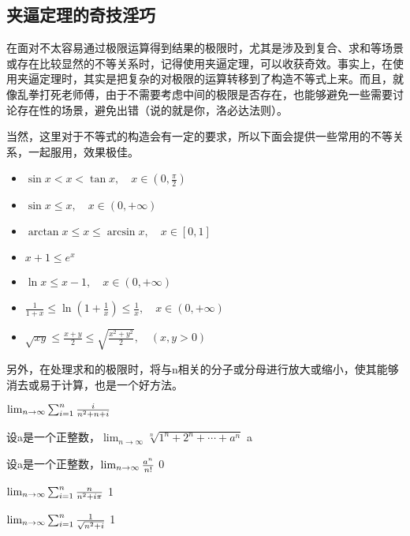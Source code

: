 \subsection{夹逼定理的奇技淫巧}

在面对不太容易通过极限运算得到结果的极限时，尤其是涉及到复合、求和等场景或存在比较显然的不等关系时，记得使用夹逼定理，可以收获奇效。事实上，在使用夹逼定理时，其实是把复杂的对极限的运算转移到了构造不等式上来。而且，就像乱拳打死老师傅，由于不需要考虑中间的极限是否存在，也能够避免一些需要讨论存在性的场景，避免出错（说的就是你，洛必达法则）。

当然，这里对于不等式的构造会有一定的要求，所以下面会提供一些常用的不等关系，一起服用，效果极佳。

\begin{itemize}
\item $\sin x < x < \tan x, \quad x \in \left(0, \frac{\pi}{2}\right)$
\item $\sin x \leq x, \quad x \in (0, +\infty)$
\item $\arctan x \leq x \leq \arcsin x, \quad x \in [0, 1] $
\item $x + 1\leq e^x$
\item $\ln x\leq x - 1 , \quad x \in (0, +\infty)$
\item $\frac{1}{1 + x} \leq \ln\left(1 + \frac{1}{x}\right) \leq \frac{1}{x}, \quad x \in (0, +\infty)$
\item $\sqrt{xy} \leq \frac{x + y}{2} \leq \sqrt{\frac{x^2 + y^2}{2}}, \quad (x, y > 0)$
\end{itemize}

\begin{example}{}

\end{example}
另外，在处理求和的极限时，将与n相关的分子或分母进行放大或缩小，使其能够消去或易于计算，也是一个好方法。
\begin{example}{$\lim_{n\to \infty}\sum_{i=1}^n{i\over n^2+n+i}$}
\end{example}



\begin{example}{设a是一个正整数，$\lim_{n\to\infty}\sqrt[n]{1^n+2^n+\cdots+a^n}$}
a
\end{example}
\begin{example}{设a是一个正整数，$\lim_{n\to\infty}{a^n\over n!}$}
0
\end{example}
\begin{example}{$\lim_{n\to\infty}\sum_{i=1}^n{n\over n^2+i\pi}$}
1
\end{example}
\begin{example}{$\lim_{n\to\infty}\sum_{i=1}^n{1\over\sqrt{n^2+i}}$}
1
\end{example}

